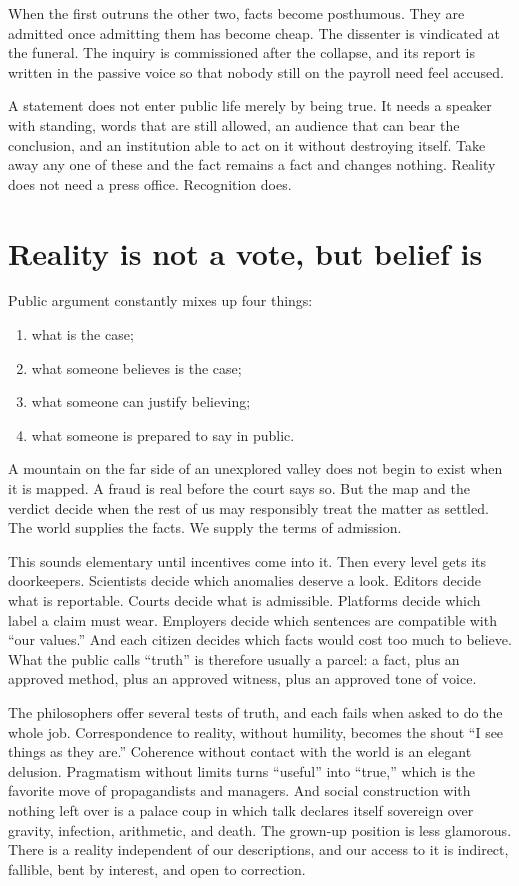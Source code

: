 \documentclass[12pt,a4paper]{book}
\begin{document}
When the first outruns the other two, facts become posthumous. They are admitted once admitting them has become cheap. The dissenter is vindicated at the funeral. The inquiry is commissioned after the collapse, and its report is written in the passive voice so that nobody still on the payroll need feel accused.

A statement does not enter public life merely by being true. It needs a speaker with standing, words that are still allowed, an audience that can bear the conclusion, and an institution able to act on it without destroying itself. Take away any one of these and the fact remains a fact and changes nothing. Reality does not need a press office. Recognition does.

\section{Reality is not a vote, but belief is}

Public argument constantly mixes up four things:

\begin{enumerate}
  \item what is the case;
  \item what someone believes is the case;
  \item what someone can justify believing;
  \item what someone is prepared to say in public.
\end{enumerate}

A mountain on the far side of an unexplored valley does not begin to exist when it is mapped. A fraud is real before the court says so. But the map and the verdict decide when the rest of us may responsibly treat the matter as settled. The world supplies the facts. We supply the terms of admission.

This sounds elementary until incentives come into it. Then every level gets its doorkeepers. Scientists decide which anomalies deserve a look. Editors decide what is reportable. Courts decide what is admissible. Platforms decide which label a claim must wear. Employers decide which sentences are compatible with ``our values.'' And each citizen decides which facts would cost too much to believe. What the public calls ``truth'' is therefore usually a parcel: a fact, plus an approved method, plus an approved witness, plus an approved tone of voice.

The philosophers offer several tests of truth, and each fails when asked to do the whole job. Correspondence to reality, without humility, becomes the shout ``I see things as they are.'' Coherence without contact with the world is an elegant delusion. Pragmatism without limits turns ``useful'' into ``true,'' which is the favorite move of propagandists and managers. And social construction with nothing left over is a palace coup in which talk declares itself sovereign over gravity, infection, arithmetic, and death. The grown-up position is less glamorous. There is a reality independent of our descriptions, and our access to it is indirect, fallible, bent by interest, and open to correction.
\end{document}
